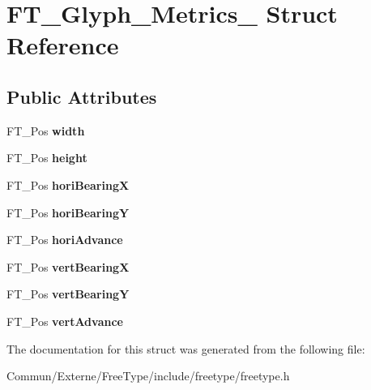 \hypertarget{struct_f_t___glyph___metrics__}{}\section{F\+T\+\_\+\+Glyph\+\_\+\+Metrics\+\_\+ Struct Reference}
\label{struct_f_t___glyph___metrics__}
\subsection*{Public Attributes}
\begin{DoxyCompactItemize}
\item 
F\+T\+\_\+\+Pos {\bfseries width}\hypertarget{struct_f_t___glyph___metrics___a0ff1be869e6a28d1f2990b0e5719dca9}{}\label{struct_f_t___glyph___metrics___a0ff1be869e6a28d1f2990b0e5719dca9}

\item 
F\+T\+\_\+\+Pos {\bfseries height}\hypertarget{struct_f_t___glyph___metrics___aa2a76ec448ec9d18acf343f01b77cb21}{}\label{struct_f_t___glyph___metrics___aa2a76ec448ec9d18acf343f01b77cb21}

\item 
F\+T\+\_\+\+Pos {\bfseries hori\+BearingX}\hypertarget{struct_f_t___glyph___metrics___a2afc877f52c8a8910ec144a1948186cc}{}\label{struct_f_t___glyph___metrics___a2afc877f52c8a8910ec144a1948186cc}

\item 
F\+T\+\_\+\+Pos {\bfseries hori\+BearingY}\hypertarget{struct_f_t___glyph___metrics___afd97c10d43ed1f66598a18884468b536}{}\label{struct_f_t___glyph___metrics___afd97c10d43ed1f66598a18884468b536}

\item 
F\+T\+\_\+\+Pos {\bfseries hori\+Advance}\hypertarget{struct_f_t___glyph___metrics___af12db260a90b8a7c938ad48ebf20ccbe}{}\label{struct_f_t___glyph___metrics___af12db260a90b8a7c938ad48ebf20ccbe}

\item 
F\+T\+\_\+\+Pos {\bfseries vert\+BearingX}\hypertarget{struct_f_t___glyph___metrics___aead5c5637b983b811738bff3bcea8cea}{}\label{struct_f_t___glyph___metrics___aead5c5637b983b811738bff3bcea8cea}

\item 
F\+T\+\_\+\+Pos {\bfseries vert\+BearingY}\hypertarget{struct_f_t___glyph___metrics___a7f1aba91b86fddeb11030eab15dcce08}{}\label{struct_f_t___glyph___metrics___a7f1aba91b86fddeb11030eab15dcce08}

\item 
F\+T\+\_\+\+Pos {\bfseries vert\+Advance}\hypertarget{struct_f_t___glyph___metrics___a594f43c64fe5c12a399a0f0a47c04990}{}\label{struct_f_t___glyph___metrics___a594f43c64fe5c12a399a0f0a47c04990}

\end{DoxyCompactItemize}


The documentation for this struct was generated from the following file\+:\begin{DoxyCompactItemize}
\item 
Commun/\+Externe/\+Free\+Type/include/freetype/freetype.\+h\end{DoxyCompactItemize}
